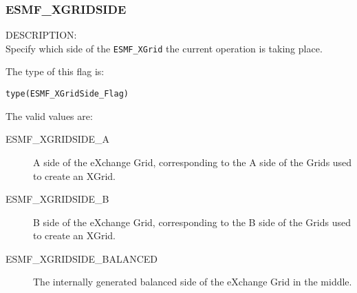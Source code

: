 
\subsubsection{ESMF\_XGRIDSIDE}
\label{opt:xgridoptions}

{\sf DESCRIPTION:\\}  
Specify which side of the {\tt ESMF\_XGrid} the current operation is taking place.

The type of this flag is:

{\tt type(ESMF\_XGridSide\_Flag)}

The valid values are:
\begin{description}
\item [ESMF\_XGRIDSIDE\_A]
  A side of the eXchange Grid, corresponding to the A side of the Grids used to create an XGrid.
\item [ESMF\_XGRIDSIDE\_B]
  B side of the eXchange Grid, corresponding to the B side of the Grids used to create an XGrid.
\item [ESMF\_XGRIDSIDE\_BALANCED]
  The internally generated balanced side of the eXchange Grid in the middle.
\end{description}
